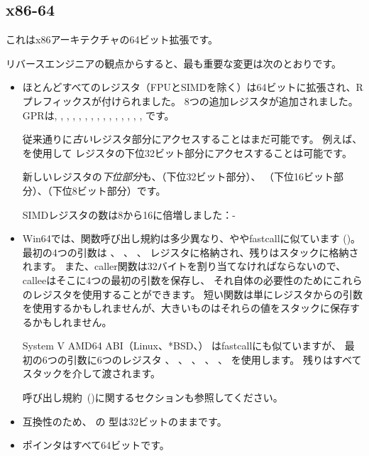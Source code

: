 
\subsection{x86-64}
\label{x86-64}

これはx86アーキテクチャの64ビット拡張です。

リバースエンジニアの観点からすると、最も重要な変更は次のとおりです。

\myindex{\CLanguageElements!\Pointers}
\begin{itemize}

\item

ほとんどすべてのレジスタ（FPUとSIMDを除く）は64ビットに拡張され、Rプレフィックスが付けられました。
8つの追加レジスタが追加されました。
\ac{GPR}は\RAX, \RBX, \RCX, \RDX, 
\RBP, \RSP, \RSI, \RDI, , , , 
, , , , です。

従来通りに\emph{古い}レジスタ部分にアクセスすることはまだ可能です。
例えば、 \EAX を使用して \RAX レジスタの下位32ビット部分にアクセスすることは可能です。


新しいレジスタの\emph{下位部分}も、（下位32ビット部分）、
（下位16ビット部分）、（下位8ビット部分）です。


SIMDレジスタの数は8から16に倍増しました：-

\item

Win64では、関数呼び出し規約は多少異なり、ややfastcallに似ています
()。
最初の4つの引数は \RCX 、 \RDX 、 、 レジスタに格納され、残りはスタックに格納されます。
また、\gls{caller}関数は32バイトを割り当てなければならないので、\gls{callee}はそこに4つの最初の引数を保存し、
それ自体の必要性のためにこれらのレジスタを使用することができます。
短い関数は単にレジスタからの引数を使用するかもしれませんが、大きいものはそれらの値をスタックに保存するかもしれません。

System V AMD64 ABI（Linux、*BSD、\MacOSX） \SysVABI はfastcallにも似ていますが、
最初の6つの引数に6つのレジスタ \RDI 、 \RSI 、 \RDX 、 \RCX 、  、 を使用します。
残りはすべてスタックを介して渡されます。

呼び出し規約~()に関するセクションも参照してください。

\item
互換性のため、 \CCpp の \Tint 型は32ビットのままです。

\item
ポインタはすべて64ビットです。

\end{itemize}

